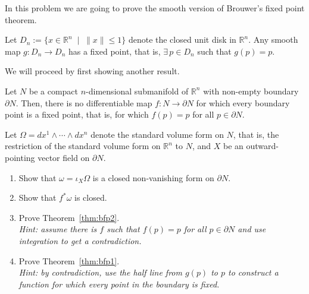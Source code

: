\begin{exercise}
	In this problem we are going to prove the smooth version of Brouwer's fixed point theorem.

	\begin{theorem}\label{thm:bfp1}
		Let $D_n:=\{x\in\mathbb{R}^n\;\mid\;\|x\|\leq 1\}$ denote the closed unit disk in $\mathbb{R}^n$. %
		Any smooth map $g: D_n \to D_n$ has a fixed point, that is, $\exists\,p\in D_n$ such that $g(p) = p$.
	\end{theorem}

	We will proceed by first showing another result.

	\begin{theorem}\label{thm:bfp2}
		Let $N$ be a compact $n$-dimensional submanifold of $\mathbb{R}^n$ with non-empty boundary $\partial N$.
		Then, there is no differentiable map $f: N \to \partial N$ for which every boundary point is a fixed point, that is, for which $f(p) = p$ for all $p\in\partial N$.
	\end{theorem}

	Let $\Omega = dx^1 \wedge \cdots\wedge dx^n$ denote the standard volume form on $N$, that is, the restriction of the standard volume form on $\mathbb{R}^n$ to $N$,
	and $X$ be an outward-pointing vector field on $\partial N$.

	\begin{enumerate}
		\item Show that $\omega = \iota_X \Omega$ is a closed non-vanishing form on $\partial N$.
		\item Show that $f^*\omega$ is closed.
		\item Prove Theorem~\ref{thm:bfp2}.\\\textit{Hint: assume there is $f$ such that $f(p)=p$ for all $p\in \partial N$ and use integration to get a contradiction.}
		\item Prove Theorem~\ref{thm:bfp1}.\\\textit{Hint: by contradiction, use the half line from $g(p)$ to $p$ to construct a function for which every point in the boundary is fixed. }
	\end{enumerate}
\end{exercise}
